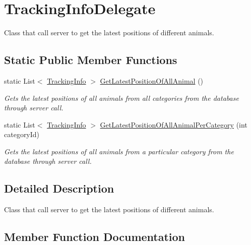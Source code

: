 \hypertarget{classWildlifeTrackingApp_1_1Delegates_1_1TrackingInfoDelegate}{}\section{Tracking\+Info\+Delegate}
\label{classWildlifeTrackingApp_1_1Delegates_1_1TrackingInfoDelegate}


Class that call server to get the latest positions of different animals.  


\subsection*{Static Public Member Functions}
\begin{DoxyCompactItemize}
\item 
static List$<$ \hyperlink{classWildlifeTrackingApp_1_1Models_1_1TrackingInfo}{Tracking\+Info} $>$ \hyperlink{classWildlifeTrackingApp_1_1Delegates_1_1TrackingInfoDelegate_a1011cec68e4e27e80b5db0475f395768}{Get\+Latest\+Position\+Of\+All\+Animal} ()
\begin{DoxyCompactList}\small\item\em Gets the latest positions of all animals from all categories from the database through server call. \end{DoxyCompactList}\item 
static List$<$ \hyperlink{classWildlifeTrackingApp_1_1Models_1_1TrackingInfo}{Tracking\+Info} $>$ \hyperlink{classWildlifeTrackingApp_1_1Delegates_1_1TrackingInfoDelegate_a4ee9025a6305396144c0feff956de558}{Get\+Latest\+Position\+Of\+All\+Animal\+Per\+Category} (int category\+Id)
\begin{DoxyCompactList}\small\item\em Gets the latest positions of all animals from a particular category from the database through server call. \end{DoxyCompactList}\end{DoxyCompactItemize}


\subsection{Detailed Description}
Class that call server to get the latest positions of different animals. 



\subsection{Member Function Documentation}
\mbox{\label{classWildlifeTrackingApp_1_1Delegates_1_1TrackingInfoDelegate_a1011cec68e4e27e80b5db0475f395768}} 
